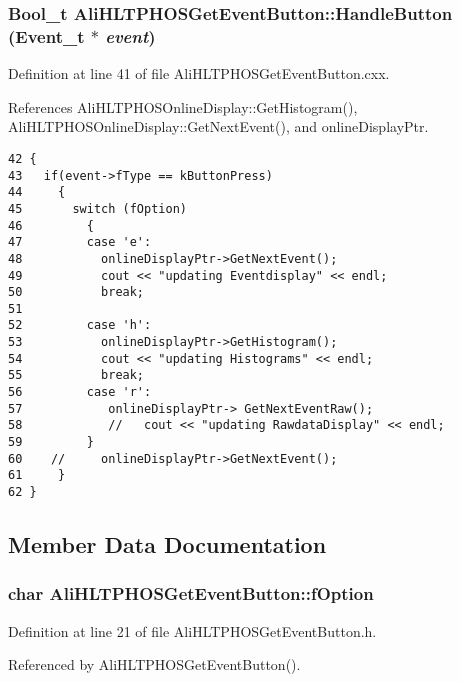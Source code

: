 \subsubsection{\setlength{\rightskip}{0pt plus 5cm}Bool\_\-t Ali\-HLTPHOSGet\-Event\-Button::Handle\-Button (Event\_\-t $\ast$ {\em event})\hspace{0.3cm}{\tt  [virtual]}}\label{classAliHLTPHOSGetEventButton_a3}




Definition at line 41 of file Ali\-HLTPHOSGet\-Event\-Button.cxx.

References Ali\-HLTPHOSOnline\-Display::Get\-Histogram(), Ali\-HLTPHOSOnline\-Display::Get\-Next\-Event(), and online\-Display\-Ptr.

\footnotesize\begin{verbatim}42 {
43   if(event->fType == kButtonPress) 
44     {
45       switch (fOption)
46         {
47         case 'e':
48           onlineDisplayPtr->GetNextEvent();
49           cout << "updating Eventdisplay" << endl;
50           break;
51 
52         case 'h':
53           onlineDisplayPtr->GetHistogram();
54           cout << "updating Histograms" << endl;
55           break;
56         case 'r':
57            onlineDisplayPtr-> GetNextEventRaw();
58            //   cout << "updating RawdataDisplay" << endl;
59         }
60    //     onlineDisplayPtr->GetNextEvent();
61     }
62 }
\end{verbatim}\normalsize 




\subsection{Member Data Documentation}
\subsubsection{\setlength{\rightskip}{0pt plus 5cm}char {\bf Ali\-HLTPHOSGet\-Event\-Button::f\-Option}\hspace{0.3cm}{\tt  [private]}}\label{classAliHLTPHOSGetEventButton_r1}




Definition at line 21 of file Ali\-HLTPHOSGet\-Event\-Button.h.

Referenced by Ali\-HLTPHOSGet\-Event\-Button().
